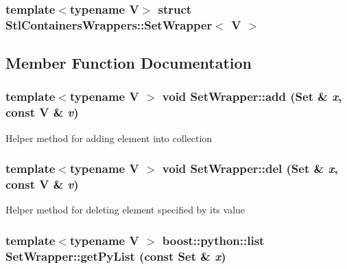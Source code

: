\subsubsection*{template$<$typename V$>$ struct StlContainersWrappers::SetWrapper$<$ V $>$}



\subsection{Member Function Documentation}
\hypertarget{struct_stl_containers_wrappers_1_1_set_wrapper_a5aa10d43c949ab14dce86ada294a517f}{
\subsubsection[{add}]{\setlength{\rightskip}{0pt plus 5cm}template$<$typename V $>$ void SetWrapper::add (Set \& {\em x}, \/  const V \& {\em v})}}
\label{struct_stl_containers_wrappers_1_1_set_wrapper_a5aa10d43c949ab14dce86ada294a517f}
Helper method for adding element into collection \hypertarget{struct_stl_containers_wrappers_1_1_set_wrapper_ace89534d1947475d9df652cc028d21ff}{
\subsubsection[{del}]{\setlength{\rightskip}{0pt plus 5cm}template$<$typename V $>$ void SetWrapper::del (Set \& {\em x}, \/  const V \& {\em v})}}
\label{struct_stl_containers_wrappers_1_1_set_wrapper_ace89534d1947475d9df652cc028d21ff}
Helper method for deleting element specified by its value \hypertarget{struct_stl_containers_wrappers_1_1_set_wrapper_a1beec5bd4543b5f175ae95877a1844b8}{
\subsubsection[{getPyList}]{\setlength{\rightskip}{0pt plus 5cm}template$<$typename V $>$ boost::python::list SetWrapper::getPyList (const Set \& {\em x})}}
